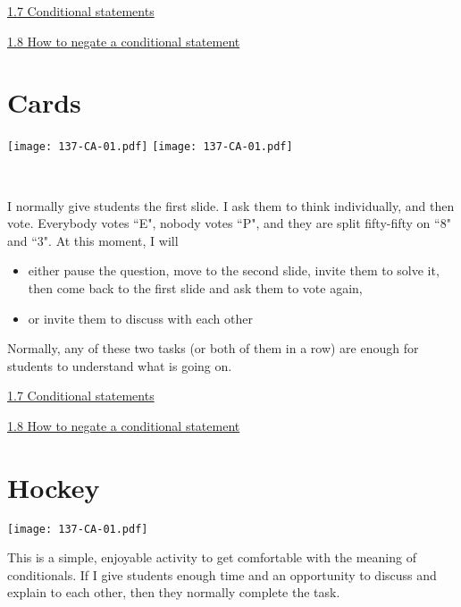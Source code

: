 \documentclass[11pt]{article}
\newcommand{\n}{\newpage}
\newcommand{\vseven}{\hspace{8mm} \href{https://www.youtube.com/watch?v=VPzlj_OJyU0&list=PLlwePzQY_wW-CPzhk-af-MXj9knthD1gx&index=7}{1.7 Conditional statements}}
\newcommand{\veight}{\hspace{8mm}\href{https://www.youtube.com/watch?v=PfAr1hhhL9o&list=PLlwePzQY_wW-CPzhk-af-MXj9knthD1gx&index=8}{1.8 How to negate a conditional statement}}
\begin{document}
\begin{videos}
\vseven

\hspace{0.1mm} \veight
\end{videos}

\n
\newpage
\section{Cards} 

\begin{center}
{ \texttt{[image: 137-CA-01.pdf]}} \quad
{ \texttt{[image: 137-CA-01.pdf]}}
\end{center}

\

\begin{comments}
		I normally give students the first slide.  I ask them to think individually, and then vote.   Everybody votes ``E", nobody votes ``P", and they are split fifty-fifty on ``8" and ``3".   At this moment, I will 
			\begin{itemize}
				\item either pause the question, move to the second slide, invite them to solve it, then come back to the first slide and ask them to vote again,
				\item or invite them to discuss with each other
			\end{itemize}
		Normally, any of these two tasks (or both of them in a row) are enough for students to understand what is going on.
\end{comments}

\begin{videos}
\vseven

\hspace{0.1mm} \veight
\end{videos}

\n
\newpage
\section{Hockey} 

\begin{center}
{ \texttt{[image: 137-CA-01.pdf]}}
\end{center}


\begin{comments}
	This is a simple, enjoyable activity to get comfortable with the meaning of conditionals.  If I give students enough time and an opportunity to discuss and explain to each other, then they normally complete the task.
\end{comments}
\end{document}
